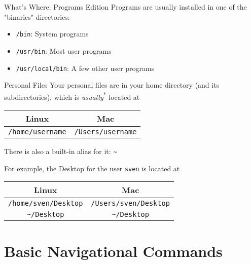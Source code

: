 \documentclass[11pt]{beamer}
\newcommand{\tsup}{\textsuperscript}                        %
\begin{document}
\begin{frame}{What's Where: Programs Edition}
  Programs are usually installed in one of the "binaries" directories:
  \begin{itemize}[<+- | alert@+>]
    \item \texttt{/bin}: System programs
    \item \texttt{/usr/bin}: Most user programs
    \item \texttt{/usr/local/bin}: A few other user programs
  \end{itemize}
\end{frame}

\begin{frame}[fragile]{Personal Files}
  Your personal files are in your home directory (and its subdirectories), which is \emph{usually}\tsup{*}
  located at

  \begin{center}
    \begin{tabular}{|c|c|}
      \hline
      Linux & Mac\\ \hline
      \texttt{/home/username} & \texttt{/Users/username}\\ \hline
    \end{tabular}
  \end{center}

  There is also a built-in alias for it: \texttt{\textasciitilde}

  For example, the Desktop for the user \texttt{sven} is located at

  \begin{center}
    \begin{tabular}{|c|c|}
      \hline
      Linux & Mac\\ \hline
      \texttt{/home/sven/Desktop} & \texttt{/Users/sven/Desktop}\\ \hline
      \texttt{\textasciitilde/Desktop} & \texttt{\textasciitilde/Desktop}\\ \hline
    \end{tabular}
  \end{center}
\end{frame}
%

%
\section{Basic Navigational Commands}
\label{sec:basic_navigational_commands}
\end{document}
